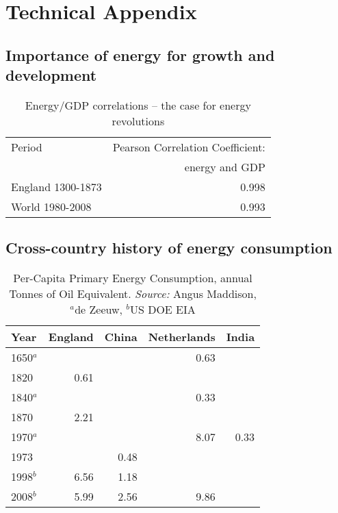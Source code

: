 \chapter{Technical Appendix}
\label{sec:techAppendix}
\fixchapterheading

\section{Importance of energy for growth and development}

\linespread{1.2}
\begin{table}[h!]
\begin{center}
\caption{Energy/GDP correlations -- the case for energy revolutions}\label{tbl:cor}
\begin{tabular}{lr}
\hline
Period&Pearson Correlation Coefficient: \\
&energy and GDP\\
\hline \hline
England 1300-1873&0.998\\
World 1980-2008& 0.993\\
\hline
\end{tabular}

\end{center}
\end{table}
\linespread{1.9}
\section{Cross-country history of energy consumption}

\linespread{1.0}
\begin{table}[h!]
	\caption{Per-Capita Primary Energy Consumption,	annual Tonnes of Oil Equivalent. \textit{Source:} Angus Maddison, $^a$de Zeeuw, $^b$US DOE EIA}
	\label{tab:capitaEnergy}
	\centering
	\begin{tabular}{lrrrr}
	\hline
	Year&England&China&Netherlands&India\\
	\hline \hline
	1650$^a$&&&0.63&  \\
	1820&0.61&&&\\
	1840$^a$ &&&0.33& \\
	1870&2.21&\\
	1970$^a$ &&&8.07&0.33 \\
	1973&&0.48&&\\
	1998$^b$&6.56&1.18\\
	2008$^b$&5.99&2.56&9.86&  \\
	\hline
	\end{tabular}
	\end{table}
\linespread{1.9}
\newpage

